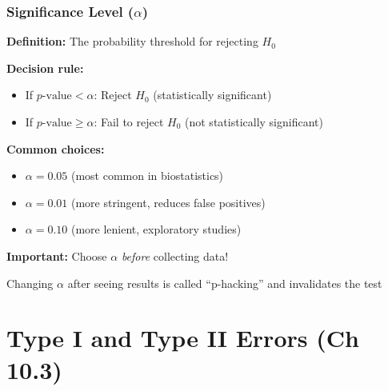 \documentclass{beamer}
\begin{document}
\begin{frame}
\frametitle{Significance Level ($\alpha$)}
\textbf{Definition:} The probability threshold for rejecting $H_0$

\vspace{0.5cm}
\textbf{Decision rule:}
\begin{itemize}
\item If $p\text{-value} < \alpha$: Reject $H_0$ (statistically significant)
\item If $p\text{-value} \geq \alpha$: Fail to reject $H_0$ (not statistically significant)
\end{itemize}

\vspace{0.5cm}
\textbf{Common choices:}
\begin{itemize}
\item $\alpha = 0.05$ (most common in biostatistics)
\item $\alpha = 0.01$ (more stringent, reduces false positives)
\item $\alpha = 0.10$ (more lenient, exploratory studies)
\end{itemize}

\vspace{0.5cm}
\textbf{Important:} Choose $\alpha$ \textit{before} collecting data!

\vspace{0.3cm}
Changing $\alpha$ after seeing results is called ``p-hacking'' and invalidates the test
\end{frame}

\section{Type I and Type II Errors (Ch 10.3)}
\end{document}
